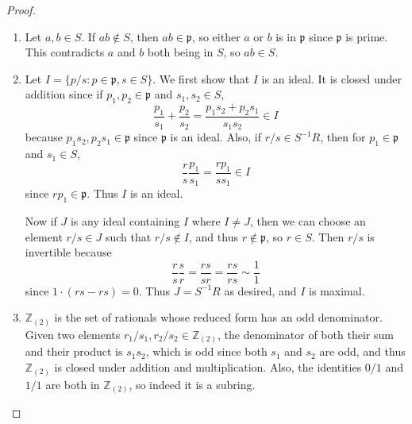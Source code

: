 \documentclass[12pt]{article}
\newcommand{\p}{\mathfrak{p}}
\theoremstyle{definition}
\begin{document}
\begin{proof}\
	\begin{enumerate}[label=(\alph*)]
		\item Let $a, b \in S$.
		      If $ab \not\in S$, then $ab \in \p$, so either $a$ or $b$ is in $\p$ since $\p$ is prime.
		      This contradicts $a$ and $b$ both being in $S$, so $ab \in S$.
		\item Let $I = \lbrace p/s : p \in \p, s \in S \rbrace$.
		      We first show that $I$ is an ideal.
          It is closed under addition since if $p_1, p_2 \in \p$ and $s_1, s_2 \in S$, \begin{equation*}
			      \frac{p_1}{s_1} + \frac{p_2}{s_2} = \frac{p_1s_2 + p_2s_1}{s_1s_2} \in I
		      \end{equation*}
          because $p_1s_2, p_2s_1 \in \p$ since $\p$ is an ideal.
          Also, if $r/s \in S^{-1}R$, then for $p_1 \in \p$ and $s_1 \in S$, \begin{equation*}
            \frac{r}{s}\frac{p_1}{s_1} = \frac{rp_1}{ss_1} \in I
          \end{equation*}
          since $rp_1 \in \p$.
          Thus $I$ is an ideal.
          
          Now if $J$ is any ideal containing $I$ where $I \neq J$, then we can choose an element $r/s \in J$ such that $r/s \not\in I$, and thus $r \not\in \p$, so $r \in S$.
          Then $r/s$ is invertible because \begin{equation*}
            \frac{r}{s}\frac{s}{r} = \frac{rs}{sr} = \frac{rs}{rs} \sim \frac{1}{1}
          \end{equation*}
          since $1\cdot(rs - rs) = 0$.
          Thus $J = S^{-1}R$ as desired, and $I$ is maximal.
        \item $\mathbb{Z}_{(2)}$ is the set of rationals whose reduced form has an odd denominator.
          Given two elements $r_1/s_1, r_2/s_2 \in \mathbb{Z}_{(2)}$, the denominator of both their sum and their product is $s_1s_2$, which is odd since both $s_1$ and $s_2$ are odd, and thus $\mathbb{Z}_{(2)}$ is closed under addition and multiplication.
          Also, the identities $0/1$ and $1/1$ are both in $\mathbb{Z}_{(2)}$, so indeed it is a subring.
	\end{enumerate}
\end{proof}
\end{document}
